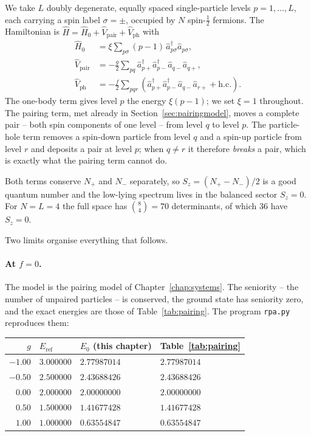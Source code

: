 We take $L$ doubly degenerate, equally spaced single-particle levels
$p=1,\dots,L$, each carrying a spin label $\sigma=\pm$, occupied by $N$
spin-$\tfrac12$ fermions.  The Hamiltonian is
$\hat{H}=\hat{H}_0+\hat{V}_{\mathrm{pair}}+\hat{V}_{\mathrm{ph}}$ with
\begin{align}
  \hat{H}_0 &= \xi\sum_{p\sigma}(p-1)\,
    \hat{a}^{\dagger}_{p\sigma}\hat{a}_{p\sigma},
  \label{eq:7-H0}\\
  \hat{V}_{\mathrm{pair}} &= -\frac{g}{2}\sum_{pq}
    \hat{a}^{\dagger}_{p+}\hat{a}^{\dagger}_{p-}
    \hat{a}_{q-}\hat{a}_{q+},
  \label{eq:7-Vpair}\\
  \hat{V}_{\mathrm{ph}} &= -\frac{f}{2}\sum_{pqr}
    \left(\hat{a}^{\dagger}_{p+}\hat{a}^{\dagger}_{p-}
      \hat{a}_{q-}\hat{a}_{r+} + \mathrm{h.c.}\right).
  \label{eq:7-Vph}
\end{align}
The one-body term gives level $p$ the energy $\xi(p-1)$; we set $\xi=1$
throughout.  The pairing term, met already in
Section~\ref{sec:pairingmodel}, moves a complete pair -- both spin components
of one level -- from level $q$ to level $p$.  The particle-hole term removes a
spin-down particle from level $q$ and a spin-up particle from level $r$ and
deposits a pair at level $p$; when $q\ne r$ it therefore \emph{breaks} a pair,
which is exactly what the pairing term cannot do.

Both terms conserve $N_+$ and $N_-$ separately, so
$S_z=(N_+-N_-)/2$ is a good quantum number and the low-lying spectrum lives in
the balanced sector $S_z=0$.  For $N=L=4$ the full space has
$\binom{8}{4}=70$ determinants, of which $36$ have $S_z=0$.

Two limits organise everything that follows.

\paragraph{At $f=0$.}
The model is the pairing model of Chapter~\ref{chap:systems}.  The seniority
-- the number of unpaired particles -- is conserved, the ground state has
seniority zero, and the exact energies are those of
Table~\ref{tab:pairing}.  The program \texttt{rpa.py} reproduces them:
\begin{center}
\renewcommand{\arraystretch}{1.2}
\begin{tabular}{rlll}
\toprule
$g$ & $E_{\mathrm{ref}}$ & $E_0$ (this chapter) & Table~\ref{tab:pairing}\\
\midrule
$-1.00$ & $3.000000$ & $2.77987014$ & $2.77987014$\\
$-0.50$ & $2.500000$ & $2.43688426$ & $2.43688426$\\
$0.00$  & $2.000000$ & $2.00000000$ & $2.00000000$\\
$0.50$  & $1.500000$ & $1.41677428$ & $1.41677428$\\
$1.00$  & $1.000000$ & $0.63554847$ & $0.63554847$\\
\bottomrule
\end{tabular}
\end{center}

